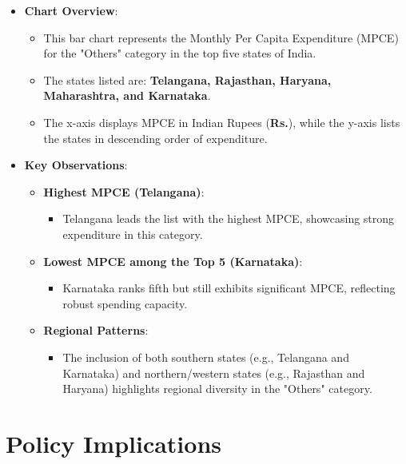 \documentclass{article}
\begin{document}
\begin{itemize}
	\item \textbf{Chart Overview}:
	\begin{itemize}
		\item This bar chart represents the Monthly Per Capita Expenditure (MPCE) for the "Others" category in the top five states of India.
		\item The states listed are: \textbf{Telangana, Rajasthan, Haryana, Maharashtra, and Karnataka}.
		\item The x-axis displays MPCE in Indian Rupees (\textbf{Rs.}), while the y-axis lists the states in descending order of expenditure.
	\end{itemize}
	\item \textbf{Key Observations}:
	\begin{itemize}
		\item \textbf{Highest MPCE (Telangana)}:
		\begin{itemize}
			\item Telangana leads the list with the highest MPCE, showcasing strong expenditure in this category.
		\end{itemize}
		\item \textbf{Lowest MPCE among the Top 5 (Karnataka)}:
		\begin{itemize}
			\item Karnataka ranks fifth but still exhibits significant MPCE, reflecting robust spending capacity.
		\end{itemize}
		\item \textbf{Regional Patterns}:
		\begin{itemize}
			\item The inclusion of both southern states (e.g., Telangana and Karnataka) and northern/western states (e.g., Rajasthan and Haryana) highlights regional diversity in the "Others" category.
		\end{itemize}
	\end{itemize}
\end{itemize}

\section*{Policy Implications}
\end{document}
